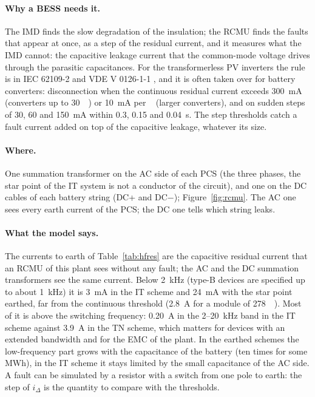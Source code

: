\documentclass[11pt,a4paper]{scrartcl}
\begin{document}
\begin{onehalfspace}
\paragraph{Why a BESS needs it.} The IMD finds the slow degradation of the insulation; the RCMU finds the faults that appear at once, as a step of the residual current, and it measures what the IMD cannot: the capacitive leakage current that the common-mode voltage drives through the parasitic capacitances. For the transformerless PV inverters the rule is in IEC 62109-2 and VDE V 0126-1-1 \cite{iec62109_2, vde0126}, and it is often taken over for battery converters: disconnection when the continuous residual current exceeds \SI{300}{mA} (converters up to \SI{30}{\kilo\VA}) or \SI{10}{mA} per \si{\kilo\VA} (larger converters), and on sudden steps of 30, 60 and \SI{150}{mA} within 0.3, 0.15 and \SI{0.04}{s}. The step thresholds catch a fault current added on top of the capacitive leakage, whatever its size.

\paragraph{Where.} One summation transformer on the AC side of each PCS (the three phases, the star point of the IT system is not a conductor of the circuit), and one on the DC cables of each battery string (DC+ and DC$-$); Figure~\ref{fig:rcmu}. The AC one sees every earth current of the PCS; the DC one tells which string leaks.

\paragraph{What the model says.} The currents to earth of Table~\ref{tab:hfres} are the capacitive residual current that an RCMU of this plant sees without any fault; the AC and the DC summation transformers see the same current. Below \SI{2}{kHz} (type-B devices are specified up to about \SI{1}{kHz}) it is \SI{3}{mA} in the IT scheme and \SI{24}{mA} with the star point earthed, far from the continuous threshold (\SI{2.8}{A} for a module of \SI{278}{\kilo\VA}). Most of it is above the switching frequency: \SI{0.20}{A} in the 2--\SI{20}{kHz} band in the IT scheme against \SI{3.9}{A} in the TN scheme, which matters for devices with an extended bandwidth and for the EMC of the plant. In the earthed schemes the low-frequency part grows with the capacitance of the battery (ten times for some MWh), in the IT scheme it stays limited by the small capacitance of the AC side. A fault can be simulated by a resistor with a switch from one pole to earth: the step of $i_\Delta$ is the quantity to compare with the thresholds.


\end{onehalfspace}
\end{document}
